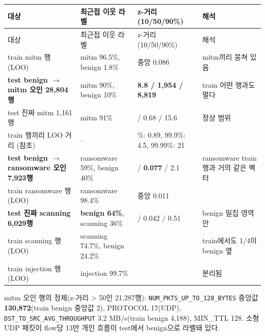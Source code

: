 \begingroup
\footnotesize
\begin{longtable}{>{\raggedright\arraybackslash}p{}>{\raggedright\arraybackslash}p{}>{\raggedright\arraybackslash}p{}>{\raggedright\arraybackslash}p{}}
\toprule
대상 & 최근접 이웃 라벨 & z-거리 (10/\allowbreak{}50/\allowbreak{}90\%) & 해석 \\ \midrule
\endfirsthead
대상 & 최근접 이웃 라벨 & z-거리 (10/\allowbreak{}50/\allowbreak{}90\%) & 해석 \\ \midrule
\endhead
{}train mitm 행 (LOO) & mitm 96.5\%, benign 1.8\% & 중앙 0.086 & mitm끼리 뭉쳐 있음 \\
{}\textbf{test benign  \ensuremath{\rightarrow}  mitm 오인 28,804행} & mitm 90\%, benign 10\% & \textbf{8.8 /\allowbreak{} 1,954 /\allowbreak{} 8,819} & train 어떤 행과도 멀다 \\
{}test 진짜 mitm 1,161행 & mitm 91\% & 0.09 /\allowbreak{} 0.68 /\allowbreak{} 15.6 & 정상 범위 \\
{}train 행끼리 LOO 거리 (참조) & – & 99\%: 0.89, 99.9\%: 4.5, 99.99\%: 21 &  \\
{}\textbf{test benign  \ensuremath{\rightarrow}  ransomware 오인 7,923행} & ransomware 59\%, benign 40\% & 0.02 /\allowbreak{} \textbf{0.077} /\allowbreak{} 2.1 & ransomware train 행과 거의 같은 벡터 \\
{}train ransomware 행 (LOO) & ransomware 98.4\% & 중앙 0.011 &  \\
{}\textbf{test 진짜 scanning 6,029행} & \textbf{benign 64\%}, scanning 36\% & 0.01 /\allowbreak{} 0.042 /\allowbreak{} 0.51 & benign 밀집 영역 안 \\
{}train scanning 행 (LOO) & scanning 74.7\%, benign 24.2\% &  & train에서도 1/\allowbreak{}4이 benign 옆 \\
{}train injection 행 (LOO) & injection 99.7\% &  & 분리됨 \\
\bottomrule
\end{longtable}
\endgroup
mitm 오인 행의 정체(z-거리 > 50인 21,287행): \texttt{NUM\_\allowbreak{}\allowbreak{}PKTS\allowbreak{}\_\allowbreak{}\allowbreak{}UP\_\allowbreak{}\allowbreak{}TO\_\allowbreak{}\allowbreak{}1\allowbreak{}28\_\allowbreak{}\allowbreak{}BYTES\allowbreak{}} 중앙값 \textbf{130,872}(train benign 중앙값 2), PROTOCOL 17(UDP), \texttt{DST\_\allowbreak{}\allowbreak{}TO\_\allowbreak{}\allowbreak{}S\allowbreak{}RC\_\allowbreak{}\allowbreak{}AVG\_\allowbreak{}\allowbreak{}T\allowbreak{}HROUGHPU\allowbreak{}T} 3.2 MB/\allowbreak{}s(train benign 4,188), MIN\_\allowbreak{}TTL 128. 소형 UDP 패킷이 flow당 13만 개인 흐름이 test에서 benign으로 라벨돼 있다.

